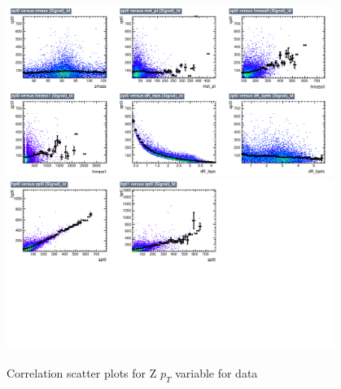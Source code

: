 \begin{figure}[!htb]%
\centering
\includegraphics[width=0.95\textwidth]{figures/CRDY/dataset/plots/correlationscatter_zpt0__Id_c1.pdf}
\includegraphics[width=0.95\textwidth]{figures/CRDY/dataset/plots/correlationscatter_zpt0__Id_c2.pdf}
\caption{ Correlation scatter plots for Z $p_{T}$  variable for data}%
\label{fig:correlations_CRDY_zpt_S}                                                       
\end{figure}



